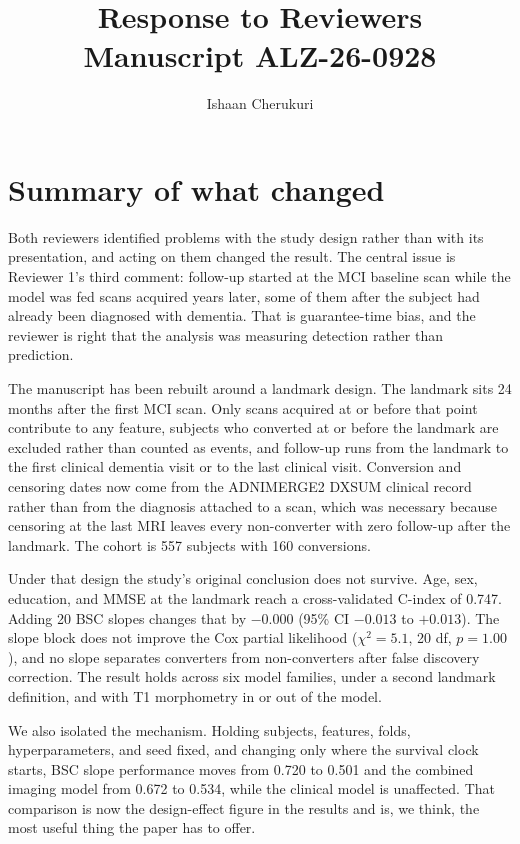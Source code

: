 \documentclass[11pt]{article}
\title{Response to Reviewers\\[4pt]\large Manuscript ALZ-26-0928}
\author{Ishaan Cherukuri}
\date{}
\begin{document}
\maketitle

\section*{Summary of what changed}

Both reviewers identified problems with the study design rather than with its presentation, and acting on them changed the result. The central issue is Reviewer 1's third comment: follow-up started at the MCI baseline scan while the model was fed scans acquired years later, some of them after the subject had already been diagnosed with dementia. That is guarantee-time bias, and the reviewer is right that the analysis was measuring detection rather than prediction.

The manuscript has been rebuilt around a landmark design. The landmark sits 24 months after the first MCI scan. Only scans acquired at or before that point contribute to any feature, subjects who converted at or before the landmark are excluded rather than counted as events, and follow-up runs from the landmark to the first clinical dementia visit or to the last clinical visit. Conversion and censoring dates now come from the ADNIMERGE2 DXSUM clinical record rather than from the diagnosis attached to a scan, which was necessary because censoring at the last MRI leaves every non-converter with zero follow-up after the landmark. The cohort is 557 subjects with 160 conversions.

Under that design the study's original conclusion does not survive. Age, sex, education, and MMSE at the landmark reach a cross-validated C-index of 0.747. Adding 20 BSC slopes changes that by $-0.000$ (95\% CI $-0.013$ to $+0.013$). The slope block does not improve the Cox partial likelihood ($\chi^2 = 5.1$, 20 df, $p = 1.00$), and no slope separates converters from non-converters after false discovery correction. The result holds across six model families, under a second landmark definition, and with T1 morphometry in or out of the model.

We also isolated the mechanism. Holding subjects, features, folds, hyperparameters, and seed fixed, and changing only where the survival clock starts, BSC slope performance moves from 0.720 to 0.501 and the combined imaging model from 0.672 to 0.534, while the clinical model is unaffected. That comparison is now the design-effect figure in the results and is, we think, the most useful thing the paper has to offer.
\end{document}
